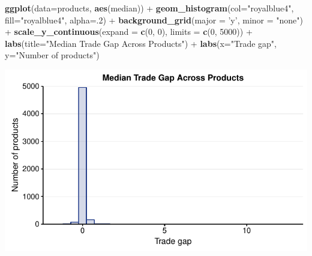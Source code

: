 \documentclass[10pt,]{article}
\newenvironment{Shaded}{\begin{snugshade}}{\end{snugshade}}
\newcommand{\KeywordTok}[1]{\textcolor[rgb]{0.13,0.29,0.53}{\textbf{{#1}}}}
\newcommand{\DataTypeTok}[1]{\textcolor[rgb]{0.13,0.29,0.53}{{#1}}}
\newcommand{\DecValTok}[1]{\textcolor[rgb]{0.00,0.00,0.81}{{#1}}}
\newcommand{\StringTok}[1]{\textcolor[rgb]{0.31,0.60,0.02}{{#1}}}
\newcommand{\NormalTok}[1]{{#1}}
\begin{document}
\begin{Shaded}
\begin{Highlighting}[]
\KeywordTok{ggplot}\NormalTok{(}\DataTypeTok{data=}\NormalTok{products, }\KeywordTok{aes}\NormalTok{(median)) +}
\StringTok{  }\KeywordTok{geom_histogram}\NormalTok{(}\DataTypeTok{col=}\StringTok{"royalblue4"}\NormalTok{,}
                 \DataTypeTok{fill=}\StringTok{"royalblue4"}\NormalTok{,}
                 \DataTypeTok{alpha=}\NormalTok{.}\DecValTok{2}\NormalTok{) +}
\StringTok{  }\KeywordTok{background_grid}\NormalTok{(}\DataTypeTok{major =} \StringTok{'y'}\NormalTok{, }\DataTypeTok{minor =} \StringTok{"none"}\NormalTok{) +}
\StringTok{  }\KeywordTok{scale_y_continuous}\NormalTok{(}\DataTypeTok{expand =} \KeywordTok{c}\NormalTok{(}\DecValTok{0}\NormalTok{, }\DecValTok{0}\NormalTok{), }\DataTypeTok{limits =} \KeywordTok{c}\NormalTok{(}\DecValTok{0}\NormalTok{, }\DecValTok{5000}\NormalTok{)) +}
\StringTok{  }\KeywordTok{labs}\NormalTok{(}\DataTypeTok{title=}\StringTok{"Median Trade Gap Across Products"}\NormalTok{) +}
\StringTok{  }\KeywordTok{labs}\NormalTok{(}\DataTypeTok{x=}\StringTok{"Trade gap"}\NormalTok{, }\DataTypeTok{y=}\StringTok{"Number of products"}\NormalTok{)}
\end{Highlighting}
\end{Shaded}

\begin{center}\includegraphics{Figs/value_summary-3} \end{center}
\end{document}
